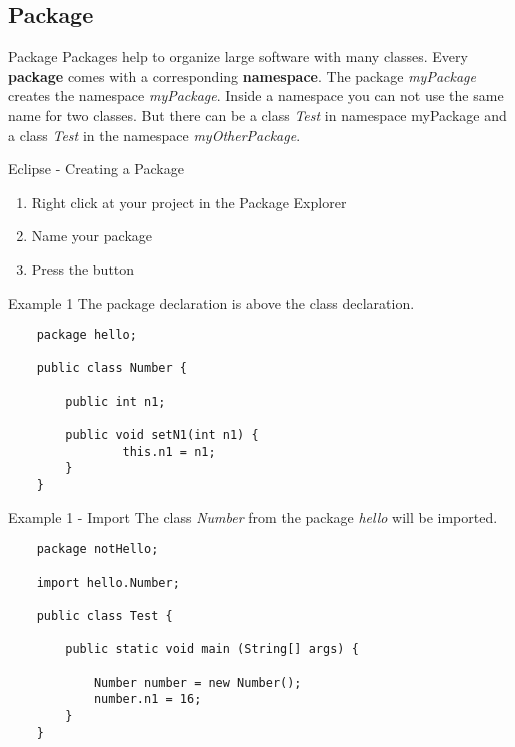 \subsection{Package}
\begin{frame}{Package}
	Packages help to organize large software with many classes.
	\vfill
	Every \textbf{package} comes with a corresponding \textbf{namespace}. 
	The package \emph{myPackage} creates the namespace \emph{myPackage}.
	\vfill
	Inside a namespace you can not use the same name for two classes.
	But there can be a class \emph{Test} in namespace {myPackage} and 
	a class \emph{Test} in the namespace \emph{myOtherPackage}.
\end{frame}
\begin{frame}[fragile]{Eclipse - Creating a Package}
	\begin{enumerate}
		\item Right click at your project in the Package Explorer \hfill \\
		\item Name your package
		\item Press the  button
	\end{enumerate}
\end{frame}
\begin{frame}[fragile]{Example 1}
	The package declaration is above the class declaration.
	\begin{lstlisting}
	package hello;	
	
	public class Number {
	
	    public int n1;
	    
	    public void setN1(int n1) {
	            this.n1 = n1;
	    }
	}
	\end{lstlisting}
\end{frame}
\begin{frame}[fragile]{Example 1 - Import}
	The class \emph{Number} from the package \emph{hello} will be imported.
	\begin{lstlisting}
	package notHello;
	
	import hello.Number;	
	
	public class Test {

	    public static void main (String[] args) {
	
	        Number number = new Number();
	        number.n1 = 16;
	    }
	}
	\end{lstlisting}
\end{frame}
